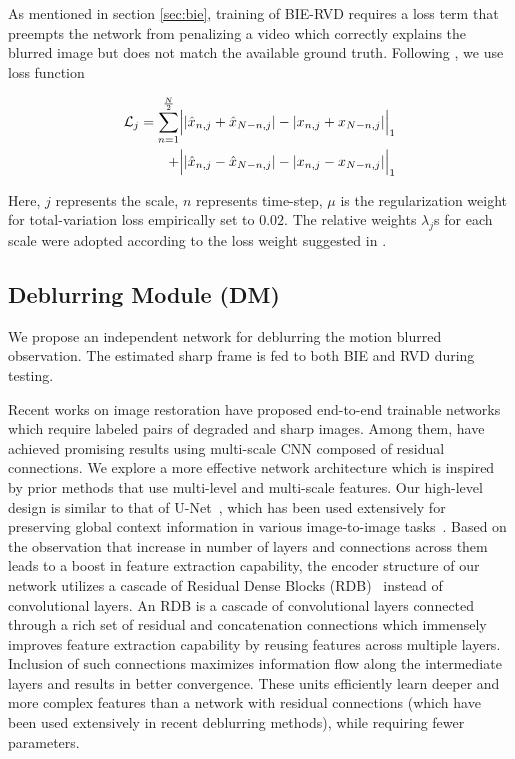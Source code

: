 \documentclass[10pt,twocolumn,letterpaper]{article}
\begin{document}
As mentioned in section \ref{sec:bie}, training of BIE-RVD requires a loss term that preempts the network from penalizing a video which correctly explains the blurred image but does not match the available ground truth. Following \cite{jin2018learning}, we use loss function

\begin{align}
\mathcal{L}_j= \sum_{n=1}^\frac{N}{2} &\textstyle \Big| |\hat{x}_{n,j} + \hat{x}_{N-n,j}| - |x_{n,j} + x_{N-n,j}| \Big|_1 \notag \\ 
 +&\textstyle\Big| |\hat{x}_{n,j} - \hat{x}_{N-n,j}| - |x_{n,j} - x_{N-n,j}| \Big|_1
\label{eq:SumDiff_blurryInd}
\end{align} 

\noindent Here, $j$ represents the scale, $n$ represents time-step, $\mu$ is the regularization weight for total-variation loss empirically set to $0.02$. The relative weights $\lambda_j$s for each scale were adopted according to the loss weight suggested in \cite{mayer2016large}. 

\subsection{Deblurring Module (DM)}


We propose an independent network for deblurring the motion blurred observation. The estimated sharp frame is fed to both BIE and RVD during testing. 

  Recent works on image restoration have proposed end-to-end trainable networks which require labeled pairs of degraded and sharp images. Among them, \cite{nah2017deep,tao2018scale} have achieved promising results using multi-scale CNN composed of residual connections. We explore a more effective network architecture which is inspired by prior methods that use multi-level and multi-scale features. Our high-level design is similar to that of U-Net~\cite{ronneberger2015u}, which has been used extensively for preserving global context information in various image-to-image tasks~\cite{isola2017image}. Based on the observation that increase in number of layers and connections across them leads to a boost in feature extraction capability, the encoder structure of our network utilizes a cascade of Residual Dense Blocks (RDB)~\cite{zhang2018residual} instead of convolutional layers. An RDB is a cascade of convolutional layers connected through a rich set of residual and concatenation connections which immensely improves feature extraction capability by reusing features across multiple layers.  Inclusion of such connections maximizes information flow along the intermediate layers and results in better convergence. These units efficiently learn deeper and more complex features than a network with residual connections (which have been used extensively in recent deblurring methods\cite{nah2017deep,kupyn2017deblurgan,tao2018scale,jin2018learning}), while requiring fewer parameters.
\end{document}
